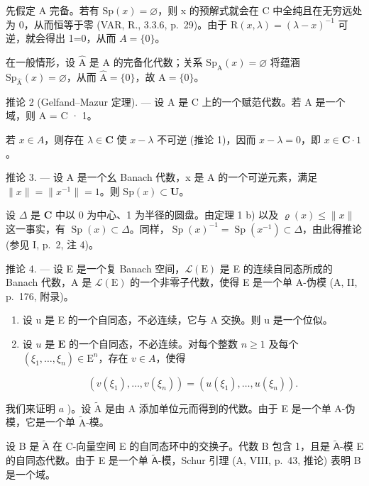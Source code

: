 先假定 A 完备。若有 \(\mathrm{Sp}(x)=\varnothing\)，则 x 的预解式就会在 C 中全纯且在无穷远处为 0，从而恒等于零 (VAR, R., 3.3.6, p.~29)。由于 \(\mathrm{R}(x,\lambda)=(\lambda-x)^{-1}\) 可逆，就会得出 1=0，从而 \(A=\{0\}\)。

在一般情形，设 \(\widehat{\mathrm{A}}\) 是 A 的完备化代数；关系 \(\mathrm{Sp}_{\mathrm{A}}(x) = \varnothing\) 将蕴涵 \(\mathrm{Sp}_{\widehat{\mathrm{A}}} (x) = \varnothing\)，从而 \(\widehat{\mathrm{A}} = \{0\}\)，故 \(\mathrm{A} = \{0\}\)。

推论 2 (Gelfand–Mazur 定理). --- 设 A 是 C 上的一个赋范代数。若 A 是一个域，则 A = C · 1。

若 \(x \in A\)，则存在 \(\lambda \in \mathbf{C}\) 使 \(x - \lambda\) 不可逆 (推论 1)，因而 \(x - \lambda = 0\)，即 \(x \in \mathbf{C} \cdot 1\)。

推论 3. --- 设 A 是一个幺 Banach 代数，x 是 A 的一个可逆元素，满足 \(\|x\|=\|x^{-1}\|=1\)。则 \(\mathrm{Sp}(x)\subset\mathbf{U}\)。

设 \(\Delta\) 是 \(\mathbf{C}\) 中以 0 为中心、1 为半径的圆盘。由定理 1 b) 以及 \(\varrho(x) \leqslant \|x\|\) 这一事实，有 \(\operatorname{Sp}(x) \subset \Delta\)。同样，\(\operatorname{Sp}(x)^{-1} = \operatorname{Sp}(x^{-1}) \subset \Delta\)，由此得推论 (参见 I, p.~2, 注 4)。

推论 4. --- 设 E 是一个复 Banach 空间，\(\mathcal{L}(\mathrm{E})\) 是 E 的连续自同态所成的 Banach 代数，A 是 \(\mathcal{L}(\mathrm{E})\) 的一个非零子代数，使得 E 是一个单 A-伪模 (A, II, p.~176, 附录)。

\begin{enumerate}
\def\labelenumi{\alph{enumi})}
\item
  设 u 是 E 的一个自同态，不必连续，它与 A 交换。则 u 是一个位似。
\item
  设 \(u\) 是 \(\mathbf{E}\) 的一个自同态，不必连续。对每个整数 \(n \geqslant 1\) 及每个 \((\xi_1, \ldots, \xi_n) \in \mathrm{E}^n\)，存在 \(v \in A\)，使得

\[
(v (\xi_ {1}), \dots , v (\xi_ {n})) = (u (\xi_ {1}), \dots , u (\xi_ {n})).
\]

\end{enumerate}

我们来证明 \(a\) )。设 \(\widetilde{\mathrm{A}}\) 是由 A 添加单位元而得到的代数。由于 E 是一个单 A-伪模，它是一个单 \(\widetilde{\mathrm{A}}\)-模。

设 B 是 \(\tilde{\mathsf{A}}\) 在 C-向量空间 E 的自同态环中的交换子。代数 B 包含 1，且是 \(\tilde{\mathsf{A}}\)-模 E 的自同态代数。由于 E 是一个单 \(\tilde{\mathsf{A}}\)-模，Schur 引理 (A, VIII, p.~43, 推论) 表明 B 是一个域。

